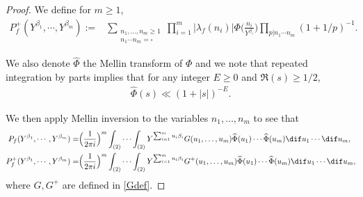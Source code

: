 \documentclass[twoside,leqno,10pt, A4]{amsart}
\begin{document}
\begin{proof}
  We define for $m \geq 1$,
\begin{align*}
 P^+_f(Y^{\beta_1}, \cdots, Y^{\beta_m}):=& \sum_{\substack{n_1,\dots,n_m \geq 1\\ n_1\cdots n_m=\square}}  \prod_{i=1}^{m}|\lambda_f(n_i)|\Phi\Big(\frac{n_i}{Y^{\beta_i}}\Big)\prod_{p|n_1\cdots n_m}(1+1/p)^{-1}.
\end{align*}

  We also denote $\widehat{\Phi}$ the Mellin transform of $\Phi$ and we note that repeated integration by parts implies that for any integer $E\geq 0$ and $\Re(s)\geq 1/2$,
\begin{align}
\label{Phibound}
\widehat{\Phi}(s)\ll (1+|s|)^{-E}.
\end{align}

   We then apply Mellin inversion to the variables $n_1,\dots, n_{m}$ to see that
\begin{align}
\label{Hsq0}
\begin{split}
P_f(Y^{\beta_1}, \cdots, Y^{\beta_m})=& \Big(\frac{1}{2\pi i}\Big)^{m}\int_{(2)}\cdots\int_{(2)}Y^{\sum^m_{i=1}u_i\beta_i}G(u_1,\dots,u_{m})
\widehat{\Phi}(u_1)\cdots\widehat{\Phi}(u_{m})
\dif u_1\cdots \dif u_{m}, \\
P^+_f(Y^{\beta_1}, \cdots, Y^{\beta_m})=& \Big(\frac{1}{2\pi i}\Big)^{m}\int_{(2)}\cdots\int_{(2)}Y^{\sum^m_{i=1}u_i\beta_i}G^+(u_1,\dots,u_{m})
\widehat{\Phi}(u_1)\cdots\widehat{\Phi}(u_{m})
\dif u_1\cdots \dif u_{m},
\end{split}
\end{align}
where $G, G^+$ are defined in \eqref{Gdef}.


\end{proof}
\end{document}
